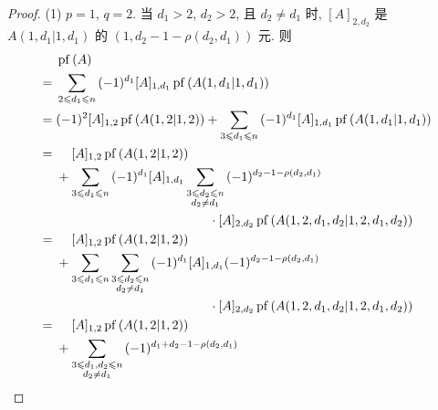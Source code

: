 \begin{proof}
    (1)
    \(p = 1\), \(q = 2\).
    当 \(d_1 > 2\), \(d_2 > 2\), 且 \(d_2 \neq d_1\) 时,
    \([A]_{2,d_2}\) 是 \(A({1,d_1}|{1,d_1})\)
    的 \((1, d_2 - 1 - \rho (d_2, d_1))\) 元.
    则
    \begin{align*}
             &
        \operatorname{pf} {(A)}
        \\
        = {} &
        \sum_{2 \leq d_1 \leq n}
        {
        (-1)^{d_1} [A]_{1,d_1}
        \operatorname{pf} {(A({1,d_1}|{1,d_1}))}
        }
        \\
        = {} &
        (-1)^{2} [A]_{1,2}
        \operatorname{pf} {(A({1,2}|{1,2}))}
        +
        \sum_{3 \leq d_1 \leq n}
        {
        (-1)^{d_1} [A]_{1,d_1}
        \operatorname{pf} {(A({1,d_1}|{1,d_1}))}
        }
        \\
        = {} &
        \hphantom{{} + {}}
        [A]_{1,2}
        \operatorname{pf} {(A({1,2}|{1,2}))}
        \\
             &
        +
        \sum_{3 \leq d_1 \leq n}
        {
            (-1)^{d_1} [A]_{1,d_1}
        \sum_{\substack{3 \leq d_2 \leq n      \\d_2 \neq d_1}}
            {
                (-1)^{d_2 - 1 - \rho(d_2, d_1)}
            }
        }
        \\
             &
        \qquad \qquad \qquad
        \qquad \qquad \qquad
        \cdot
        [A]_{2,d_2}
        \operatorname{pf} {(A({1,2,d_1,d_2}|{1,2,d_1,d_2}))}
        \\
        = {} &
        \hphantom{{} + {}}
        [A]_{1,2}
        \operatorname{pf} {(A({1,2}|{1,2}))}
        \\
             &
        +
        \sum_{3 \leq d_1 \leq n}
        {
        \sum_{\substack{3 \leq d_2 \leq n      \\d_2 \neq d_1}}
            {
                (-1)^{d_1}
                    [A]_{1,d_1}
                (-1)^{d_2 - 1 - \rho(d_2, d_1)}
            }
        }
        \\
             &
        \qquad \qquad \qquad
        \qquad \qquad \qquad
        \cdot
        [A]_{2,d_2}
        \operatorname{pf} {(A({1,2,d_1,d_2}|{1,2,d_1,d_2}))}
        \\
        = {} &
        \hphantom{{} + {}}
        [A]_{1,2}
        \operatorname{pf} {(A({1,2}|{1,2}))}
        \\
             &
        +
        \sum_{\substack{3 \leq d_1, d_2 \leq n \\d_2 \neq d_1}}
        {
        (-1)^{d_1 + d_2 - 1 - \rho(d_2, d_1)}
}
\end{align*}
\end{proof}
